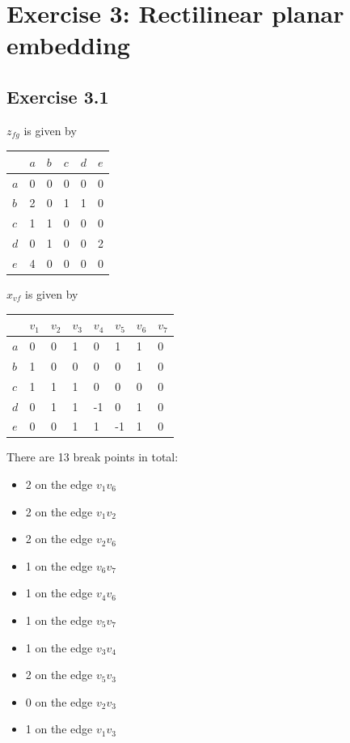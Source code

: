\documentclass[11pt,a4paper]{article}
\begin{document}
\section{Exercise 3: Rectilinear planar embedding}

\subsection{Exercise 3.1}
$z_{fg}$ is given by
\begin{tabular}{|l||l|l|l|l|l|}
    \hline
     & $a$ & $b$ & $c$ & $d$ & $e$ \\
    \hline
    \hline
    $a$ & 0 & 0 & 0 & 0 & 0 \\
    $b$ & 2 & 0 & 1 & 1 & 0 \\
    $c$ & 1 & 1 & 0 & 0 & 0 \\
    $d$ & 0 & 1 & 0 & 0 & 2 \\
    $e$ & 4 & 0 & 0 & 0 & 0 \\
    \hline
\end{tabular}


$x_{vf}$ is given by
\begin{tabular}{|l||l|l|l|l|l|l|l|}
    \hline
     & $v_1$ & $v_2$ & $v_3$ & $v_4$ & $v_5$ & $v_6$ & $v_7$ \\
    \hline
    \hline
    $a$ & 0 & 0 & 1 &  0 &  1 & 1 & 0 \\
    $b$ & 1 & 0 & 0 &  0 &  0 & 1 & 0 \\
    $c$ & 1 & 1 & 1 &  0 &  0 & 0 & 0 \\
    $d$ & 0 & 1 & 1 & -1 &  0 & 1 & 0 \\
    $e$ & 0 & 0 & 1 &  1 & -1 & 1 & 0 \\
    \hline
\end{tabular}

There are 13 break points in total:
\begin{itemize}
    \item 2 on the edge $v_1v_6$
    \item 2 on the edge $v_1v_2$
    \item 2 on the edge $v_2v_6$
    \item 1 on the edge $v_6v_7$
    \item 1 on the edge $v_4v_6$
    \item 1 on the edge $v_5v_7$
    \item 1 on the edge $v_3v_4$
    \item 2 on the edge $v_5v_3$
    \item 0 on the edge $v_2v_3$
    \item 1 on the edge $v_1v_3$
\end{itemize}
\end{document}
